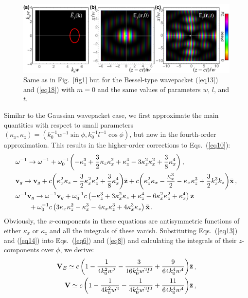 \documentclass[12pt, a4paper, superscriptaddress, final]{iopart}
\begin{document}
\begin{figure}[!t]
\includegraphics[width=\linewidth]{Fig_2.jpg}
\caption{Same as in Fig.~\ref{fig1} but for the Bessel-type wavepacket (\ref{eq13}) and (\ref{eq18}) with $m=0$ and the same values of parameters $w$, $l$, and $t$.}
\label{fig2}
\end{figure}


Similar to the Gaussian wavepacket case, we first approximate the main quantities with respect to small parameters $(\kappa_x,\kappa_z) = (k_0^{-1}w^{-1} \sin\phi, k_0^{-1}l^{-1} \cos\phi)$, but now in the fourth-order approximation. This results in the higher-order corrections to Eqs.~(\ref{eq10}):
%
\begin{align}
\label{eq14}
& \omega^{-1} \to  \omega^{-1}  + \omega_0^{-1}\! \left( - \kappa_z^3 + \frac{3}{2}\kappa_z \kappa_x^2 + \kappa_z^4 - 3\kappa_z^2\kappa_x^2 +\frac{3}{8}\kappa_x^4 \right), \nonumber \\
& {\bf v}_g \to  {\bf v}_g + c \!\left( \kappa_x^2 \kappa_z - \frac{3}{2}\kappa_x^2\kappa_z^2 +\frac{3}{8}\kappa_x^4 \right)\! \bar{\bf z} 
 + c\! \left(\kappa_z^2 \kappa_x -\frac{\kappa_x^3}{2}  -\kappa_x \kappa_z^3 +\frac{3}{2}k_x^3 k_z \right)\! \bar{\bf x}\,, \nonumber \\
& \omega^{-1} {\bf v}_g \to \omega^{-1} {\bf v}_g + \omega_0^{-1} c \left( - \kappa_z^3 + 3 \kappa_x^2 \kappa_z + \kappa_z^4 - 6 \kappa_x^2 \kappa_z^2 + \kappa_x^4
\right) \bar{\bf z} 
\nonumber \\
& \qquad + \omega_0^{-1} c \left( 3\kappa_x \kappa_z^2 - \kappa_x^3 - 4 \kappa_x \kappa_z^3 + 4\kappa_x^3 \kappa_z \right) \bar{\bf x}\,.
 \end{align}
 Obviously, the $x$-components in these equations are antisymmetric functions of either $\kappa_x$ or $\kappa_z$ and all the integrals of these vanish. Substituting Eqs.~(\ref{eq13}) and (\ref{eq14}) into Eqs.~(\ref{eq6}) and (\ref{eq8}) and calculating the integrals of their $z$-components over $\phi$, we derive:
%
\begin{align}
\label{eq15}
{\bf V}_E \simeq c \left( 1 - \frac{1}{4 k_0^2 w^2} - \frac{3}{16 k_0^4 w^2l^2} + \frac{9}{64 k_0^4 w^4} \right)\! \bar{\bf z}\,, \\
\label{eq16}
{\bf V} \simeq c \left( 1 - \frac{1}{4 k_0^2 w^2} - \frac{1}{4 k_0^4 w^2l^2} + \frac{11}{64 k_0^4 w^4} \right)\! \bar{\bf z}\, ,
\end{align}
%	
 
\end{document}
